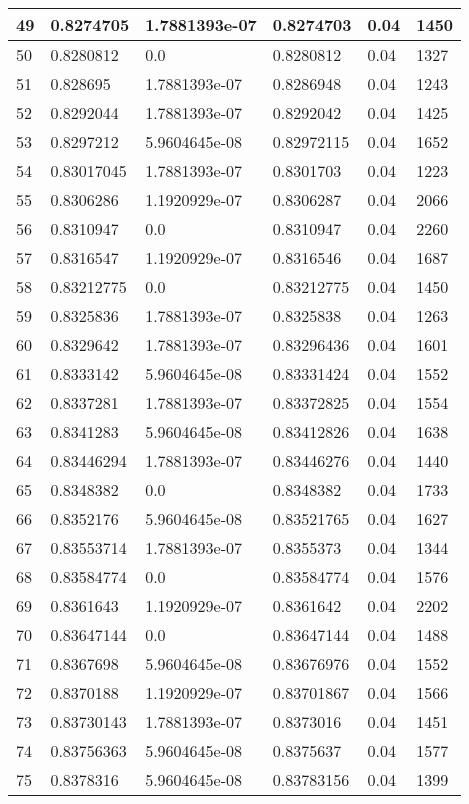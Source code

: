 \begin{longtable}{|l|l|l|l|l|l|}
49 & 0.8274705 & 1.7881393e-07 & 0.8274703 & 0.04 & 1450 \\ \hline 
50 & 0.8280812 & 0.0 & 0.8280812 & 0.04 & 1327 \\ \hline 
51 & 0.828695 & 1.7881393e-07 & 0.8286948 & 0.04 & 1243 \\ \hline 
52 & 0.8292044 & 1.7881393e-07 & 0.8292042 & 0.04 & 1425 \\ \hline 
53 & 0.8297212 & 5.9604645e-08 & 0.82972115 & 0.04 & 1652 \\ \hline 
54 & 0.83017045 & 1.7881393e-07 & 0.8301703 & 0.04 & 1223 \\ \hline 
55 & 0.8306286 & 1.1920929e-07 & 0.8306287 & 0.04 & 2066 \\ \hline 
56 & 0.8310947 & 0.0 & 0.8310947 & 0.04 & 2260 \\ \hline 
57 & 0.8316547 & 1.1920929e-07 & 0.8316546 & 0.04 & 1687 \\ \hline 
58 & 0.83212775 & 0.0 & 0.83212775 & 0.04 & 1450 \\ \hline 
59 & 0.8325836 & 1.7881393e-07 & 0.8325838 & 0.04 & 1263 \\ \hline 
60 & 0.8329642 & 1.7881393e-07 & 0.83296436 & 0.04 & 1601 \\ \hline 
61 & 0.8333142 & 5.9604645e-08 & 0.83331424 & 0.04 & 1552 \\ \hline 
62 & 0.8337281 & 1.7881393e-07 & 0.83372825 & 0.04 & 1554 \\ \hline 
63 & 0.8341283 & 5.9604645e-08 & 0.83412826 & 0.04 & 1638 \\ \hline 
64 & 0.83446294 & 1.7881393e-07 & 0.83446276 & 0.04 & 1440 \\ \hline 
65 & 0.8348382 & 0.0 & 0.8348382 & 0.04 & 1733 \\ \hline 
66 & 0.8352176 & 5.9604645e-08 & 0.83521765 & 0.04 & 1627 \\ \hline 
67 & 0.83553714 & 1.7881393e-07 & 0.8355373 & 0.04 & 1344 \\ \hline 
68 & 0.83584774 & 0.0 & 0.83584774 & 0.04 & 1576 \\ \hline 
69 & 0.8361643 & 1.1920929e-07 & 0.8361642 & 0.04 & 2202 \\ \hline 
70 & 0.83647144 & 0.0 & 0.83647144 & 0.04 & 1488 \\ \hline 
71 & 0.8367698 & 5.9604645e-08 & 0.83676976 & 0.04 & 1552 \\ \hline 
72 & 0.8370188 & 1.1920929e-07 & 0.83701867 & 0.04 & 1566 \\ \hline 
73 & 0.83730143 & 1.7881393e-07 & 0.8373016 & 0.04 & 1451 \\ \hline 
74 & 0.83756363 & 5.9604645e-08 & 0.8375637 & 0.04 & 1577 \\ \hline 
75 & 0.8378316 & 5.9604645e-08 & 0.83783156 & 0.04 & 1399 \\ \hline 
\end{longtable}
